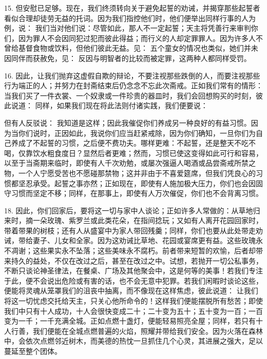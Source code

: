 15. 但安慰已足够。现在，我们终须转向关于避免起誓的劝诫，并揭穿那些起誓者看似合理却徒劳无益的托词。因为我们指控他们时，他们便举出同样行事的人为例，说： 我们当对他们说：尽管如此，那人不一定起誓；天主将凭善行来审判你们，因为罪人不会因同犯过犯而彼此得益；而行义的人却定罪罪人。因为许多人不曾给基督食物或饮料，但他们彼此无益。见： 五个童女的情况也类似，她们并未因同伴而获赦免，见： 反因与明智者的比较而被定罪，这两种人都同样受罚。\par

16. 因此，让我们抛弃这虚假自欺的辩论，不要注视那些跌倒的人，而要注视那些行为端正的人；并努力在封斋结束后仍念念不忘此次斋戒。正如我们常有的情形：当我们买了一件衣裳、一个奴隶或一件珍贵的器皿时，我们会回想购买的时刻，彼此说道： 同样，如果我们现在将此法则付诸实践，我们便要说：\par

但有人反驳说： 我知道是这样；因此我催促你们养成另一种良好的有益习惯。因为当你们说时，正因如此，我说你们应当赶紧戒除，因为你们确知，一旦你们为自己养成了不起誓的习惯，之后便不费功夫。哪样更难：不起誓，还是整天不吃不喝，仅靠饮水粗食度日？显然后者更难；然而，习惯已使这变得如此可行和容易，以至于当斋期来临时，即使有人千次劝勉，或屡次强逼人喝酒或品尝斋戒所禁之物，一个人宁愿受苦也不愿碰那禁物；这并非由于不喜爱筵席，但我们凭良心的习惯都坚忍承受。起誓之事亦然；正如现在，即使有人施加极大压力，你们也会因固守习惯而坚定不移；同样，在那事上，即使有人万次催促，你们也不会背离习惯。\par

18. 因此，你们回家后，要将这一切与家中人谈论；正如许多人常做的：从草地归来时，摘一朵玫瑰、紫罗兰或此类花朵，在指间捻玩；又如有人离开花园回家时，带着带果的树枝；还有人从盛宴中为家人带回残羹；同样，你们也要从此处带走劝诫，带给妻子、儿女和全家。因为这劝诫比草地、花园或宴席更有益。这些玫瑰永不凋谢；这些果实永不坠落；这些美味永不腐朽。前者带来短暂的欢愉，后者却带来持久的益处，不仅在改过之后，甚至在改过之中。试想，若抛开一切公私事务，不断只谈论神圣律法，在餐桌、广场及其他聚会中，这是何等的美事！若我们专注于此，便不会说出危险或有害的话，也不会无意中犯罪。若我们闲暇时谈论这些，便能将灵魂从笼罩我们的沮丧中抽离，而不像现在这样焦虑，彼此说道： 让我们将这一切忧虑交托给天主，只关心他所命令的！这样我们便能摆脱所有愁苦；即使我们中只有十人成功，十人会很快变成二十；二十变为五十；五十变为一百；一百变为一千；一千充满全城。正如点燃十盏灯，便能轻易照亮全屋；同样，若只有十人行善，我们便能在全城点燃普遍的火焰，照耀并带给我们安全。因为火落在森林中，会依次点燃邻近树木，而美德的热忱一旦抓住几个心灵，其进展之强大，足以蔓延至整个团体。\par

